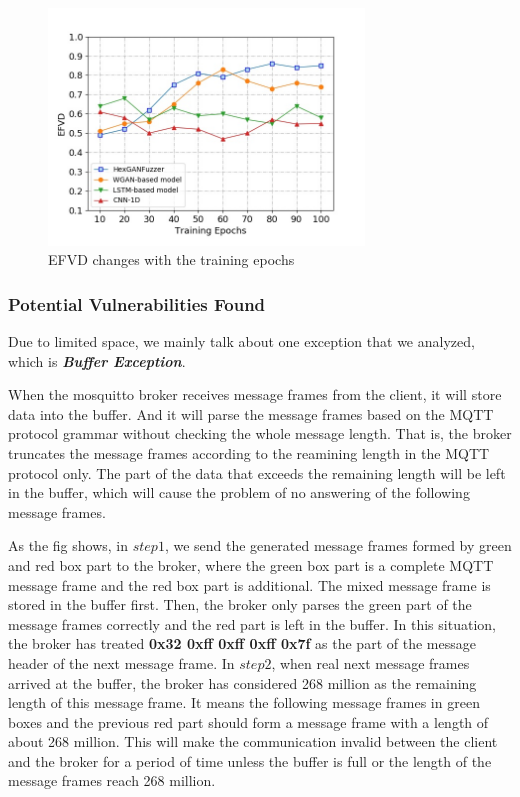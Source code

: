 \begin{figure}[htbp]
	\centering
	\includegraphics[width=3.3in]{FIGURE_EFVD.jpg}
	\caption{EFVD changes with the training epochs}
	\label{FIGURE_EFVD}
\end{figure}

\subsubsection{Potential Vulnerabilities Found}
Due to limited space, we mainly talk about one exception that we analyzed, which is \textit{\textbf{Buffer Exception}}.

When the mosquitto broker receives message frames from the client, it will store data into the buffer. And it will parse the message frames based on the MQTT protocol grammar without checking the whole message length. That is, the broker truncates the message frames according to the reamining length in the MQTT protocol only. The part of the data that exceeds the remaining length will be left in the buffer, which will cause the problem of no answering of the following message frames.

As the fig shows, in $step1$, we send the generated message frames formed by green and red box part to the broker, where the green box part is a complete MQTT message frame and the red box part is additional. The mixed message frame is stored in the buffer first. Then, the broker only parses the green part of the message frames correctly and the red part is left in the buffer. In this situation, the broker has treated \textbf{0x32 0xff 0xff 0xff 0x7f} as the part of the message header of the next message frame. In $step2$, when real next message frames arrived at the buffer, the broker has considered 268 million as the remaining length of this message frame. It means the following message frames in green boxes and the previous red part should form a message frame with a length of about 268 million. This will make the communication invalid between the client and the broker for a period of time unless the buffer is full or the length of the message frames reach 268 million.

